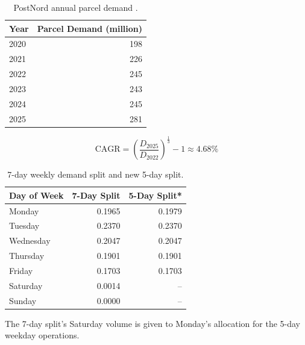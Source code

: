 \documentclass[12pt]{article}
\begin{document}
\begin{table}[htbp]
  \centering
  \caption{PostNord annual parcel demand \parencite{pn_a_2020,pn_a_2021,pn_a_2022,pn_a_2023,pn_a_2024,pn_a_2025}.}
  \label{anx:yearly_pn_demand}

  \begin{tabular}{l r}
    \toprule
    \textbf{Year} & \textbf{Parcel Demand (million)} \\
    \midrule
    2020          & 198                              \\
    2021          & 226                              \\
    2022          & 245                              \\
    2023          & 243                              \\
    2024          & 245                              \\
    2025          & 281                              \\
    \bottomrule
  \end{tabular}
\end{table}

\begin{equation}\label{eq:postnord_cagr}
  \text{CAGR} = \left( \frac{D_{2025}}{D_{2022}} \right)^{\frac{1}{3}} - 1 \approx 4.68\%
\end{equation}

\begin{table}[htbp]
  \centering
  \caption{7-day weekly demand split \parencite{dailydemand} and new 5-day split.}
  \label{anx:day_shares}

  \begin{tabular}{lrr}
    \toprule
    \textbf{Day of Week} & \textbf{7-Day Split} & \textbf{5-Day Split*} \\
    \midrule
    Monday               & 0.1965               & 0.1979                \\
    Tuesday              & 0.2370               & 0.2370                \\
    Wednesday            & 0.2047               & 0.2047                \\
    Thursday             & 0.1901               & 0.1901                \\
    Friday               & 0.1703               & 0.1703                \\
    Saturday             & 0.0014               & --                    \\
    Sunday               & 0.0000               & --                    \\
    \bottomrule
  \end{tabular}

  \vspace{1ex}
  {\raggedright \footnotesize * The 7-day split's Saturday volume is given to Monday's allocation for the 5-day weekday operations.\par}
\end{table}
\end{document}
